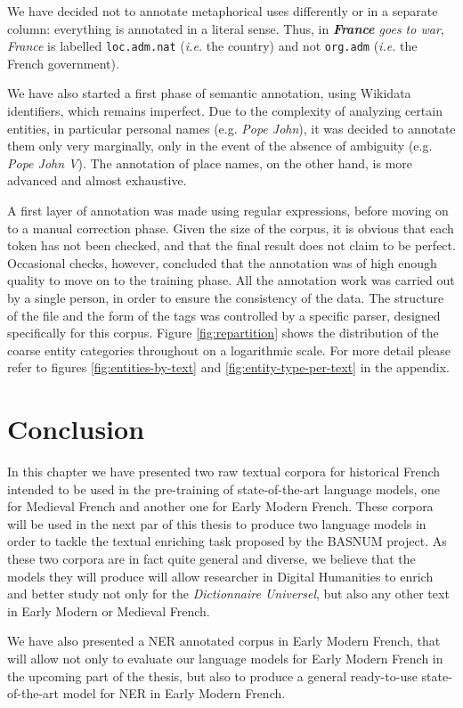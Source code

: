 We have decided not to annotate metaphorical uses differently or in a separate column: everything is annotated in a literal sense. Thus, in \textit{\textbf{France} goes to war}, \textit{France} is labelled \texttt{loc.adm.nat} (\textit{i.e.} the country) and not \texttt{org.adm} (\textit{i.e.} the French government).

We have also started a first phase of semantic annotation, using Wikidata~\citep{vrandecic-krotzsch-2014-wikidata} identifiers, which remains imperfect. Due to the complexity of analyzing certain entities, in particular personal names (e.g. \textit{Pope John}), it was decided to annotate them only very marginally, only in the event of the absence of ambiguity (e.g. \textit{Pope John V}). The annotation of place names, on the other hand, is more advanced and almost exhaustive.

A first layer of annotation was made using regular expressions, before moving on to a manual correction phase. Given the size of the corpus, it is obvious that each token has not been checked, and that the final result does not claim to be perfect. Occasional checks, however, concluded that the annotation was of high enough quality to move on to the training phase. All the annotation work was carried out by a single person, in order to ensure the consistency of the data. The structure of the file and the form of the tags was controlled by a specific parser, designed specifically for this corpus. Figure \ref{fig:repartition} shows the distribution of the coarse entity categories throughout \freemner on a logarithmic scale. For more detail please refer to figures \ref{fig:entities-by-text} and \ref{fig:entity-type-per-text} in the appendix.

\section{Conclusion}

In this chapter we have presented two raw textual corpora for historical French intended to be used in the pre-training of state-of-the-art language models, one for Medieval French and another one for Early Modern French. These corpora will be used in the next par of this thesis to produce two language models in order to tackle the textual enriching task proposed by the BASNUM project. As these two corpora are in fact quite general and diverse, we believe that the models they will produce will allow researcher in Digital Humanities to enrich and better study not only for the \emph{Dictionnaire Universel}, but also any other text in Early Modern or Medieval French.

We have also presented a NER annotated corpus in Early Modern French, that will allow not only to evaluate our language models for Early Modern French in the upcoming part of the thesis, but also to produce a general ready-to-use state-of-the-art model for NER in Early Modern French.
